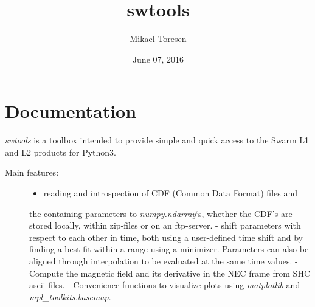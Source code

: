 \documentclass[letterpaper,10pt,english]{sphinxhowto}
\title{swtools}
\date{June 07, 2016}
\author{Mikael Toresen}
\begin{document}
\maketitle
\tableofcontents
{}\label{index::doc}

\label{index:index}\label{swtools_doc:swtools-doc}\label{swtools_doc:module-swtools}\label{swtools_doc:swtools-doc}

\section{Documentation}
\label{swtools_doc:documentation}\label{swtools_doc::doc}\label{swtools_doc:swtools-index}
\emph{swtools} is a toolbox intended to provide simple and quick access to
the Swarm L1 and L2 products for Python3.
\begin{description}
\item[{Main features:}] \leavevmode\begin{itemize}
\item {} 
reading and introspection of CDF (Common Data Format) files and

\end{itemize}

the containing parameters to \emph{numpy.ndarray}`s, whether the CDF's
are stored locally, within zip-files or on an ftp-server.
- shift parameters with respect to each other in time, both using a
user-defined time shift and by finding a best fit within a range
using a minimizer. Parameters can also be aligned through
interpolation to be evaluated at the same time values.
- Compute the magnetic field and its derivative in the NEC frame
from SHC ascii files.
- Convenience functions to visualize plots using \emph{matplotlib} and
\emph{mpl\_toolkits.basemap}.

\end{description}
\end{document}
